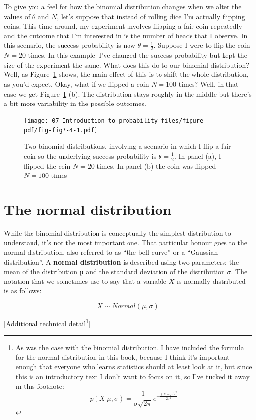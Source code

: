 \documentclass[
  a4paper,
]{book}
\begin{document}
To give you a feel for how the binomial distribution changes when we
alter the values of \(\theta\) and \(N\), let's suppose that instead of
rolling dice I'm actually flipping coins. This time around, my
experiment involves flipping a fair coin repeatedly and the outcome that
I'm interested in is the number of heads that I observe. In this
scenario, the success probability is now \(\theta = \frac{1}{2}\).
Suppose I were to flip the coin \(N = 20\) times. In this example, I've
changed the success probability but kept the size of the experiment the
same. What does this do to our binomial distribution? Well, as
Figure~\ref{fig-fig7-4} shows, the main effect of this is to shift the
whole distribution, as you'd expect. Okay, what if we flipped a coin
\(N = 100\) times? Well, in that case we get Figure~\ref{fig-fig7-4}
(b). The distribution stays roughly in the middle but there's a bit more
variability in the possible outcomes.

\begin{figure}

\texttt{[image: 07-Introduction-to-probability\_files/figure-pdf/fig-fig7-4-1.pdf]} \hfill{}

\caption{\label{fig-fig7-4}Two binomial distributions, involving a
scenario in which I flip a fair coin so the underlying success
probability is \(\theta = \frac{1}{2}\). In panel (a), I flipped the
coin \(N = 20\) times. In panel (b) the coin was flipped \(N = 100\)
times}

\end{figure}

\hypertarget{sec-The-normal-distribution}{%
\section{The normal distribution}\label{sec-The-normal-distribution}}

While the binomial distribution is conceptually the simplest
distribution to understand, it's not the most important one. That
particular honour goes to the normal distribution, also referred to as
``the bell curve'' or a ``Gaussian distribution''. A \textbf{normal
distribution} is described using two parameters: the mean of the
distribution µ and the standard deviation of the distribution
\(\sigma\). The notation that we sometimes use to say that a variable
\(X\) is normally distributed is as follows:

\[X \sim Normal(\mu,\sigma)\]

{[}Additional technical detail\footnote{As was the case with the
  binomial distribution, I have included the formula for the normal
  distribution in this book, because I think it's important enough that
  everyone who learns statistics should at least look at it, but since
  this is an introductory text I don't want to focus on it, so I've
  tucked it away in this footnote:
  \[p(X|\mu, \sigma) = \frac{1}{\sigma\sqrt{2\pi}}e^{-\frac{(X-\mu)^2}{2\sigma^2}}\]}{]}
\end{document}
